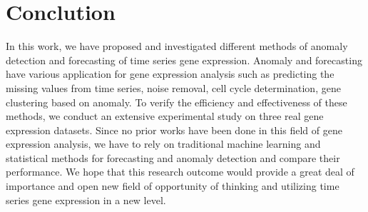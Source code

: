 \section{Conclution}
In this work, we have proposed and investigated different methods of anomaly
detection and forecasting of time series gene expression. Anomaly and forecasting have various application for gene expression analysis such as predicting the missing values from time series, noise removal, cell cycle determination, gene clustering based on anomaly. To verify the efficiency and
effectiveness of these methods, we conduct an extensive experimental study
on three real gene expression datasets. Since no prior works have been done in this field of gene expression analysis, we have to rely on traditional machine learning and statistical methods for forecasting and anomaly detection
and compare their performance. We hope that this research
outcome would provide a great deal of importance and open new field of
opportunity of thinking and utilizing time series gene expression in a new
level.